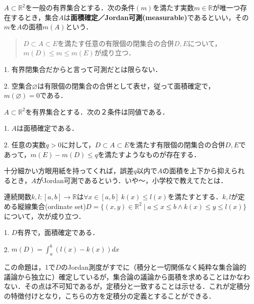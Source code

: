 \documentclass[uplatex, dvipdfmx]{jsreport}
\begin{document}
\begin{definition}[Jordan可測]
    $A\subset\mathbb{R}^2$を一般の有界集合とする．次の条件$(m)$を満たす実数$m\in\mathbb{R}$が唯一つ存在するとき，集合$A$は\textbf{面積確定／Jordan可測(measurable)}であるといい，その$m$を$A$の面積$m(A)$という．
    \begin{quote}
        $D\subset A\subset E$を満たす任意の有限個の閉集合の合併$D,E$について，$m(D)\le m\le m(E)$が成り立つ．
    \end{quote}
\end{definition}
\begin{remark*}
    1. 有界閉集合だからと言って可測だとは限らない．

    2. 空集合$\varnothing$は有限個の閉集合の合併として表せ，従って面積確定で，$m(\varnothing)=0$である．
\end{remark*}

\begin{proposition}
    $A\subset\mathbb{R}^2$を有界集合とする．次の２条件は同値である．

    1. $A$は面積確定である．

    2. 任意の実数$q>0$に対して，$D\subset A\subset E$を満たす有限個の閉集合の合併$D,E$であって，$m(E)-m(D)\le q$を満たすようなものが存在する．
\end{proposition}
\begin{remark*}
    十分細かい方眼用紙を持ってくれば，誤差$q$以内で$A$の面積を上下から抑えられるとき，$A$がJordan可測であるという．いや〜，小学校で教えてたとは．
\end{remark*}

\begin{proposition}[縦線集合のJordan測度]\label{prop-Jordan-measure-of-ordinate-sets}
    連続関数$k,l:[a,b]\to\mathbb{R}$は$\forall x\in [a,b]\; k(x)\le l(x)$を満たすとする．$k,l$が定める縦線集合(ordinate set)$D=\{(x,y)\in\mathbb{R}^2\mid a\le x\le b\land k(x)\le y\le l(x)\}$について，次が成り立つ．

    1. $D$有界で，面積確定である．

    2. $m(D)=\int^b_a(l(x)-k(x))dx$
\end{proposition}
\begin{remark*}
    この命題は，1で$D$のJordan測度がすでに（積分と一切関係なく純粋な集合論的議論から独立に）確定しているが，集合論の議論から面積を求めることはかなわない．その点は不可知であるが，定積分と一致することは示せる．これが定積分の特徴付けとなり，こちらの方を定積分の定義とすることができる．
\end{remark*}
\end{document}
